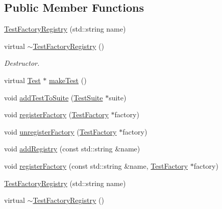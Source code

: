 \subsection*{Public Member Functions}
\begin{DoxyCompactItemize}
\item 
\hyperlink{class_test_factory_registry_a704548465fea8b52fa449845b8b42caf}{Test\+Factory\+Registry} (std\+::string name)
\item 
\hypertarget{class_test_factory_registry_abafe302ce8790e6dc20eebbd57a2fd11}{virtual \hyperlink{class_test_factory_registry_abafe302ce8790e6dc20eebbd57a2fd11}{$\sim$\+Test\+Factory\+Registry} ()}\label{class_test_factory_registry_abafe302ce8790e6dc20eebbd57a2fd11}

\begin{DoxyCompactList}\small\item\em Destructor. \end{DoxyCompactList}\item 
virtual \hyperlink{class_test}{Test} $\ast$ \hyperlink{class_test_factory_registry_a35b9c93f7129c0d9773d344b79e2e3ac}{make\+Test} ()
\item 
void \hyperlink{class_test_factory_registry_a39180636ddd11a499d15614a335b17d5}{add\+Test\+To\+Suite} (\hyperlink{class_test_suite}{Test\+Suite} $\ast$suite)
\item 
void \hyperlink{class_test_factory_registry_a632c38375727ca735e2c1897bd625b99}{register\+Factory} (\hyperlink{class_test_factory}{Test\+Factory} $\ast$factory)
\item 
void \hyperlink{class_test_factory_registry_afa3fb925b07eb34e9ccfab84812afc18}{unregister\+Factory} (\hyperlink{class_test_factory}{Test\+Factory} $\ast$factory)
\item 
void \hyperlink{class_test_factory_registry_abb68b347450c97ff0dfc9ea3dfe03f4c}{add\+Registry} (const std\+::string \&name)
\item 
void \hyperlink{class_test_factory_registry_aff8d8215ec83fbb77d46706264e2f161}{register\+Factory} (const std\+::string \&name, \hyperlink{class_test_factory}{Test\+Factory} $\ast$factory)
\item 
\hyperlink{class_test_factory_registry_a704548465fea8b52fa449845b8b42caf}{Test\+Factory\+Registry} (std\+::string name)
\item 
\hypertarget{class_test_factory_registry_a1c0c5589eb993ad6a5b1a17d439db457}{virtual \hyperlink{class_test_factory_registry_a1c0c5589eb993ad6a5b1a17d439db457}{$\sim$\+Test\+Factory\+Registry} ()}\label{class_test_factory_registry_a1c0c5589eb993ad6a5b1a17d439db457}


\end{DoxyCompactItemize}
